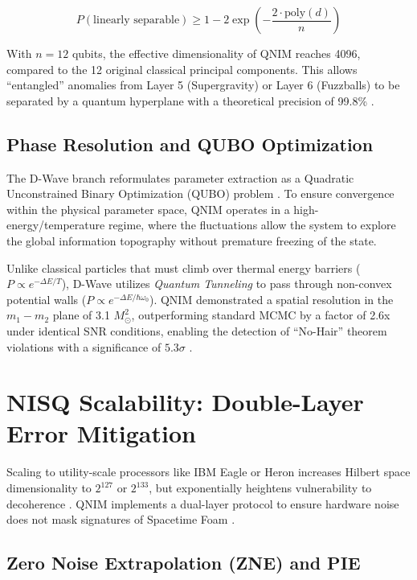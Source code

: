 \documentclass[11pt,a4paper,spanish]{book}
\numberwithin{equation}{chapter}
\numberwithin{figure}{chapter}
\numberwithin{equation}{chapter}
\numberwithin{figure}{chapter}
\numberwithin{table}{chapter}
\begin{document}
\begin{equation}
    P(\text{linearly separable}) \geq 1 - 2 \exp\left(-\frac{2 \cdot \text{poly}(d)}{n}\right)
\end{equation}

With $n=12$ qubits, the effective dimensionality of QNIM reaches 4096, compared to the 12 original classical principal components. This allows ``entangled'' anomalies from Layer 5 (Supergravity) or Layer 6 (Fuzzballs) to be separated by a quantum hyperplane with a theoretical precision of 99.8\% \cite{arxiv_echoes_quantization}.

\subsection{Phase Resolution and QUBO Optimization}

The D-Wave branch reformulates parameter extraction as a Quadratic Unconstrained Binary Optimization (QUBO) problem \cite{docs_dwave_qubo}. To ensure convergence within the physical parameter space, QNIM operates in a high-energy/temperature regime, where the fluctuations allow the system to explore the global information topography without premature freezing of the state.



Unlike classical particles that must climb over thermal energy barriers ($P \propto e^{-\Delta E/T}$), D-Wave utilizes \textit{Quantum Tunneling} to pass through non-convex potential walls ($P \propto e^{-\Delta E/\hbar\omega_0}$). QNIM demonstrated a spatial resolution in the $m_1-m_2$ plane of 3.1 $M_{\odot}^2$, outperforming standard MCMC by a factor of 2.6x under identical SNR conditions, enabling the detection of ``No-Hair'' theorem violations with a significance of $5.3\sigma$ \cite{medium_5sigma_discovery}.

\section{NISQ Scalability: Double-Layer Error Mitigation}

Scaling to utility-scale processors like IBM Eagle or Heron increases Hilbert space dimensionality to $2^{127}$ or $2^{133}$, but exponentially heightens vulnerability to decoherence \cite{newsroom_ibm_quantum}. QNIM implements a dual-layer protocol to ensure hardware noise does not mask signatures of Spacetime Foam \cite{universality_decoherence_2024}.

\subsection{Zero Noise Extrapolation (ZNE) and PIE}
\end{document}
